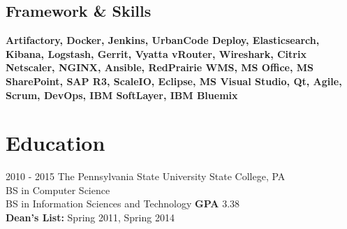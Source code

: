 \documentclass[]{friggeri-cv}
\begin{document}
\begin{aside}
  \section{Framework \& Skills}
    \textbf{Artifactory, Docker, Jenkins, UrbanCode Deploy, Elasticsearch, Kibana, Logstash, Gerrit, Vyatta vRouter, Wireshark, Citrix Netscaler, NGINX, Ansible, RedPrairie WMS, MS Office, MS SharePoint, SAP R3, ScaleIO, Eclipse, MS Visual Studio, Qt, Agile, Scrum, DevOps, IBM SoftLayer, IBM Bluemix}
\end{aside}


\section{Education}
\begin{entrylist}
  \entry
    {2010 - 2015}
    {The Pennsylvania State University \hfill \hfill State College, PA}
    {\\BS in Computer Science \\BS in Information Sciences and Technology}
    {\textbf{GPA} 3.38\\
    \textbf{Dean's List:} Spring 2011, Spring 2014}

\end{entrylist}
\end{document}
